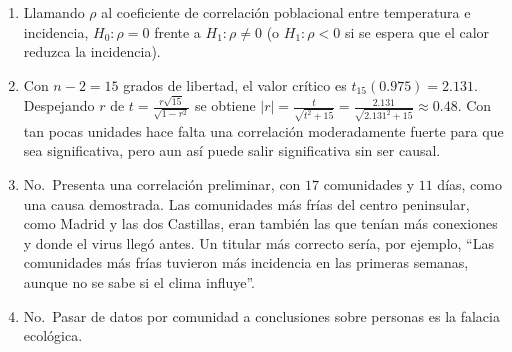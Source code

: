 \documentclass[
  spanish,
  a4paper,
]{scrreport}
\theoremstyle{definition}
\theoremstyle{remark}
\begin{document}
\begin{tcolorbox}[enhanced jigsaw, arc=.35mm, bottomrule=.15mm, bottomtitle=1mm, breakable, colback=white, colbacktitle=quarto-callout-tip-color!10!white, colframe=quarto-callout-tip-color-frame, coltitle=black, left=2mm, leftrule=.75mm, opacityback=0, opacitybacktitle=0.6, rightrule=.15mm, title=\textcolor{quarto-callout-tip-color}{\faLightbulb}\hspace{0.5em}{Solución}, titlerule=0mm, toprule=.15mm, toptitle=1mm]

\begin{enumerate}
\def\labelenumi{\alph{enumi}.}
\item
  Llamando \(\rho\) al coeficiente de correlación poblacional entre
  temperatura e incidencia, \(H_0: \rho=0\) frente a \(H_1: \rho\neq 0\)
  (o \(H_1: \rho<0\) si se espera que el calor reduzca la incidencia).
\item
  Con \(n-2=15\) grados de libertad, el valor crítico es
  \(t_{15}(0.975)=2.131\). Despejando \(r\) de
  \(t=\frac{r\sqrt{15}}{\sqrt{1-r^2}}\) se obtiene
  \(|r|=\frac{t}{\sqrt{t^2+15}}=\frac{2.131}{\sqrt{2.131^2+15}}\approx 0.48\).
  Con tan pocas unidades hace falta una correlación moderadamente fuerte
  para que sea significativa, pero aun así puede salir significativa sin
  ser causal.
\item
  No.~Presenta una correlación preliminar, con \(17\) comunidades y
  \(11\) días, como una causa demostrada. Las comunidades más frías del
  centro peninsular, como Madrid y las dos Castillas, eran también las
  que tenían más conexiones y donde el virus llegó antes. Un titular más
  correcto sería, por ejemplo, ``Las comunidades más frías tuvieron más
  incidencia en las primeras semanas, aunque no se sabe si el clima
  influye''.
\item
  No.~Pasar de datos por comunidad a conclusiones sobre personas es la
  falacia ecológica.
\end{enumerate}

\end{tcolorbox}
\end{document}
